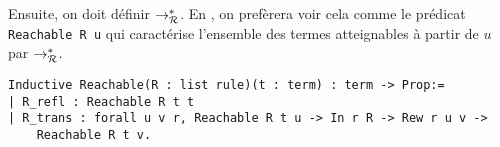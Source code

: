 Ensuite, on doit définir $\rightarrow^*_{\mathcal R}$. En \coq, on prefèrera voir cela comme le prédicat
\lstinline{Reachable R u} qui caractérise l'ensemble des termes atteignables à partir de
$u$ par $\rightarrow^*_\mathcal R$.

\begin{lstlisting}
Inductive Reachable(R : list rule)(t : term) : term -> Prop:=
| R_refl : Reachable R t t
| R_trans : forall u v r, Reachable R t u -> In r R -> Rew r u v -> 
    Reachable R t v.
\end{lstlisting}


